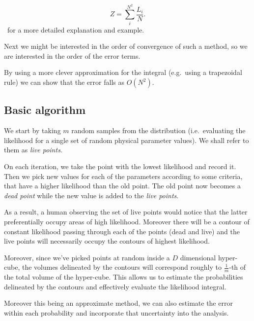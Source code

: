 \documentclass[12pt]{article}
\begin{document}
\begin{equation}
  Z = \sum_i^{N^{2}} \frac{L_i}{N}.
\end{equation}\cite[See][]{skilling2006}~for a more detailed explanation and example.

Next we might be interested in the order of convergence of such a
method, so we are interested in the order of the error terms.

By using a more clever approximation for the
integral\autocite{skilling2006} (e.g.~using a trapezoidal rule) we can
show that the error falls as \( O ( N^2 ) \).


\subsection{Basic algorithm}\label{sec-4-1}

We start by taking \( m \) random samples from the distribution
(i.e.~evaluating the likelihood for a single set of random physical
parameter values). We shall refer to them as \emph{live points}.

On each iteration, we take the point with the lowest likelihood and
record it. Then we pick new values for each of the parameters
according to some criteria, that have a higher likelihood than the
old point. The old point now becomes a \emph{dead point} while the new
value is added to the \emph{live points}.

As a result, a human observing the set of live points would notice
that the latter preferentially occupy areas of high
likelihood. Moreover there will be a contour of constant likelihood
passing through each of the points (dead and live) and the live points
will necessarily occupy the contours of highest likelihood.

Moreover, since we've picked points at random inside a \(D\)
dimensional hyper-cube, the volumes delineated by the contours will
correspond roughly to \( \frac{1}{m} \)-th of the total volume of the
hyper-cube. This allows us to estimate the probabilities delineated by
the contours and effectively evaluate the likelihood integral.

Moreover this being an approximate method, we can also estimate the
error within each probability and incorporate that uncertainty into
the analysis.
\end{document}
